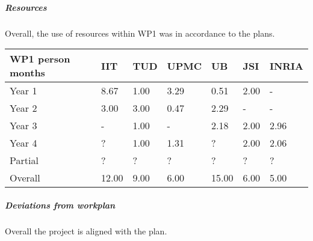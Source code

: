 

\subparagraph*{Resources}
Overall, the use of resources within WP1 was in accordance to the plans. 

\begin{center}
  \begin{tabular}{|C{1.5cm}|C{1.5cm}|C{1.5cm}|C{2cm}|C{2cm}|C{2cm}|C{2cm}|}
    \hline \footnotesize \textbf{WP1 person months}& \footnotesize
    \textbf{IIT}&\footnotesize \textbf{TUD}&\footnotesize \textbf{UPMC}&
    \footnotesize \textbf{UB} &\footnotesize \textbf{JSI} & \footnotesize \textbf{INRIA}\\
    \hline \footnotesize Year 1  & 8.67  & 1.00 & 3.29 & 0.51 & 2.00 & -\\
    \hline \footnotesize Year 2  & 3.00  & 3.00 & 0.47 & 2.29 & -    & - \\
    \hline \footnotesize Year 3  & -     & 1.00 & -    & 2.18 & 2.00 & 2.96 \\
    \hline \footnotesize Year 4  & ?     & 1.00 & 1.31 & ?    & 2.00 & 2.06 \\
   	\hline \footnotesize Partial & ?     & ?    & ?    & ?    & ?    & ?    \\
	\hline
    \hline \footnotesize Overall & 12.00 & 9.00 & 6.00 & 15.00 & 6.00 & 5.00 \\
    \hline
  \end{tabular}
\end{center}

\subparagraph*{Deviations from workplan} 
Overall the project is aligned with the plan.
